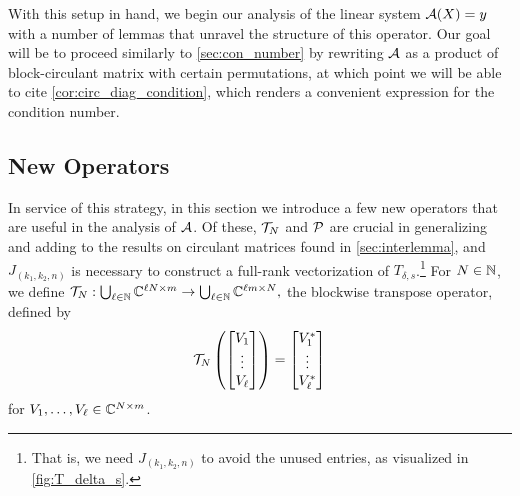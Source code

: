 With this setup in hand, we begin our analysis of the linear system $\mathcal{A}(X) = y$ with a number of lemmas that unravel the structure of this operator.  Our goal will be to proceed similarly to \cref{sec:con_number} by rewriting $\mathcal{A}$ as a product of block-circulant matrix with certain permutations, at which point we will be able to cite \cref{cor:circ_diag_condition}, which renders a convenient expression for the condition number.

\subsection{New Operators}
\label{sec:pty_new_op}
In service of this strategy, in this section we introduce a few new operators that are useful in the analysis of $\mathcal{A}$.  Of these, $\mathcal{T}_N$ and $\mathcal{P}$ are crucial in generalizing and adding to the results on circulant matrices found in \cref{sec:interlemma}, and $J_{(k_1, k_2, n)}$ is necessary to construct a full-rank vectorization of $T_{\delta, s}$.\footnote{That is, we need $J_{(k_1, k_2, n)}$ to avoid the unused entries, as visualized in \cref{fig:T_delta_s}.}  For $N \in \mathbb{N}$, we define $\mathcal{T}_N : \bigcup_{\ell \in \mathbb{N}} \mathbb{C}^{\ell N \times m} \to \bigcup_{\ell \in \mathbb{N}} \mathbb{C}^{\ell m \times N},$ the blockwise transpose operator, defined by \begin{equation} \mathcal{T}_N\left(\begin{bmatrix} V_1 \\ \vdots \\ V_\ell \end{bmatrix}\right) = \begin{bmatrix} V_1^* \\ \vdots \\ V_{\ell}^* \end{bmatrix}\label{eq:blk_trans_op} \end{equation} for $V_1, \ldots, V_\ell \in \mathbb{C}^{N \times m}$.

